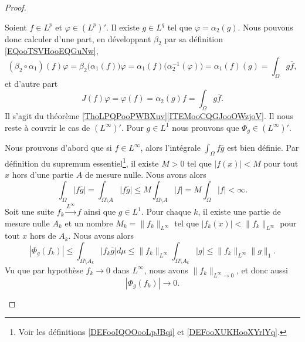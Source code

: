 \begin{proof}
\begin{subproof}
    Soient \( f\in L^p\) et \( \varphi\in (L^p)'\). Il existe \( g\in L^q\) tel que \( \varphi=\alpha_2(g)\). Nous pouvons donc calculer d'une part, en développant \( \beta_2\) par sa définition \eqref{EQooTSVHooEQGuNw},
    \begin{equation}
        (\beta_2\circ \alpha_1)(f)\varphi=\beta_2\big( \alpha_1(f) \big)\varphi
        =\alpha_1(f)\big( \alpha_2^{-1}(\varphi) \big)
        =\alpha_1(f)(g)
        =\int_{\Omega}g\bar f,
    \end{equation}
    et d'autre part
    \begin{equation}
        J(f)\varphi=\varphi(f)
        =\alpha_2(g)f
        =\int_{\Omega}g\bar f.
    \end{equation}
    Il s'agit du théorème \ref{ThoLPQPooPWBXuv}\ref{ITEMooCQGJooOWzjoV}.
    Il nous reste à couvrir le cas de \( (L^{\infty})'\). Pour \( g\in L^1\) nous prouvons que \( \Phi_g\in (L^{\infty})'\).

    \begin{subproof}
        Nous prouvons d'abord que si \( f\in L^{\infty}\), alors l'intégrale \( \int_{\Omega}f\bar g\) est bien définie. Par définition du supremum essentiel\footnote{Voir les définitions \ref{DEFooIQOOooLpJBqi} et \ref{DEFooXUKHooXYrlYq}.}, il existe \( M>0\) tel que \( | f(x) |<M\) pour tout \( x\) hors d'une partie \( A\) de mesure nulle. Nous avons alors
        \begin{equation}
            \int_{\Omega}|f\bar g|=\int_{\Omega\setminus A}| f\bar g |\leq M\int_{\Omega\setminus A}| f |= M\int_{\Omega}| f |<\infty.
        \end{equation}
        Soit une suite \( f_k\stackrel{L^{\infty}}{\longrightarrow}f\) ainsi que \( g\in L^1\). Pour chaque \( k\), il existe une partie de mesure nulle \( A_k\) et un nombre \( M_k=\| f_k \|_{L^{\infty}}\) tel que \( | f_k(x) |<\| f_k \|_{L^{\infty}}\) pour tout \( x\) hors de \( A_k\). Nous avons alors
        \begin{equation}
            | \Phi_g(f_k) |\leq \int_{\Omega\setminus A_k}| f_k\bar g |d\mu\leq \| f_k \|_{L^{\infty}}\int_{\Omega\setminus A_k}| g |\leq \| f_k \|_{L^{\infty}}\| g \|_1.
        \end{equation}
        Vu que par hypothèse \( f_k\to 0\) dans \( L^{\infty}\), nous avons \( \| f_k \|_{L^{\infty}\to 0}\), et donc aussi
        \begin{equation}
            |\Phi_g(f_k)|\to 0.
        \end{equation}
    \end{subproof}
\end{subproof}
\end{proof}


